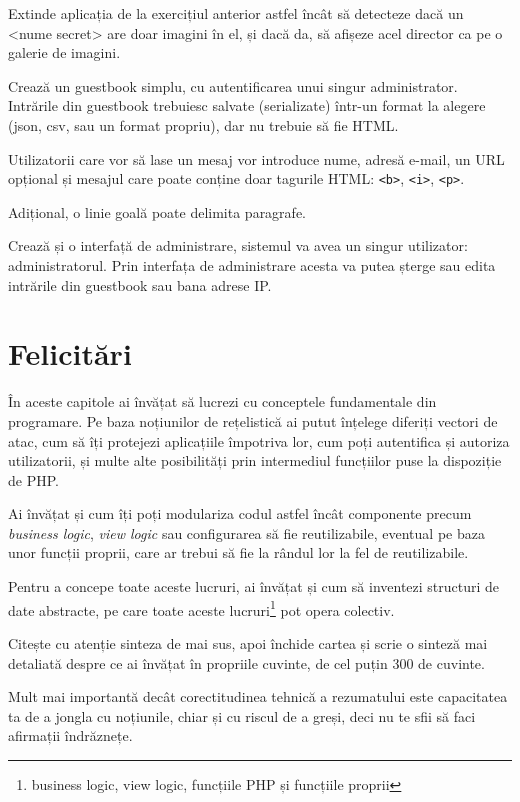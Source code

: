 \begin{Exercise}[title={Remote file storage cu galerie de imagini}]
Extinde aplicația de la exercițiul anterior astfel încât să detecteze
dacă un {\glqq}<nume secret>{\grqq} are doar imagini în el, și dacă
da, să afișeze acel director ca pe o galerie de imagini.
\end{Exercise}

\begin{Exercise}[title={Guestbook I},difficulty=2]
Crează un guestbook simplu, cu autentificarea unui singur
administrator. Intrările din guestbook trebuiesc salvate (serializate)
într-un format la alegere (json, csv, sau un format propriu), dar
nu trebuie să fie HTML.

Utilizatorii care vor să lase un mesaj vor introduce nume, adresă e-mail, un 
URL opțional și mesajul care poate conține doar tagurile HTML:
\texttt{<b>}, \texttt{<i>}, \texttt{<p>}.

Adițional, o linie goală poate delimita paragrafe.

Crează și o interfață de administrare, sistemul va avea un singur utilizator:
administratorul. Prin interfața de administrare acesta va putea șterge sau edita
intrările din guestbook sau bana adrese IP.
\end{Exercise}

\section{Felicitări}
În aceste capitole ai învățat să lucrezi cu conceptele fundamentale
din programare. Pe baza noțiunilor de rețelistică ai putut înțelege
diferiți vectori de atac, cum să îți protejezi aplicațiile împotriva
lor, cum poți autentifica și autoriza utilizatorii, și multe
alte posibilități prin intermediul funcțiilor puse la dispoziție de
PHP.

Ai învățat și cum îți poți modulariza codul astfel încât componente
precum \textit{business logic}, \textit{view logic} sau configurarea să fie
reutilizabile, eventual pe baza unor funcții proprii, care ar
trebui să fie la rândul lor la fel de reutilizabile.

Pentru a concepe toate aceste lucruri, ai învățat și cum să inventezi
structuri de date abstracte, pe care toate aceste
lucruri\footnote{business logic, view logic, funcțiile PHP și
funcțiile proprii} pot opera colectiv.

\begin{Exercise}[title={Recapitulare și sinteză}]
Citește cu atenție sinteza de mai sus, apoi închide cartea și scrie o
sinteză mai detaliată despre ce ai învățat în propriile cuvinte,
de cel puțin 300 de cuvinte.

Mult mai importantă dec\^at corectitudinea tehnică a rezumatului
este capacitatea ta de a jongla cu noțiunile, chiar și cu
riscul de a greși, deci nu te sfii să faci afirmații \^indrăznețe.
\end{Exercise}
